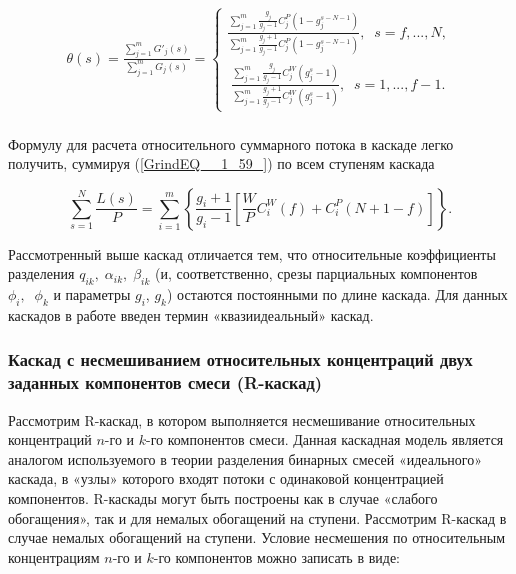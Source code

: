 \begin{equation} \label{GrindEQ__1_61_} 
\begin{array}{l} {\theta (s)=\frac{\sum _{j=1}^{m}G'_{j} (s) }{\sum _{j=1}^{m}G_{j} (s) } =\left\{\begin{array}{l} {\frac{\sum _{j=1}^{m}\frac{g_{j} }{g_{j} -1} C_{j}^{P} \left(1-g_{j}^{s-N-1} \right) }{\sum _{j=1}^{m}\frac{g_{j} +1}{g_{j} -1}  C_{j}^{P} \left(1-g_{j}^{s-N-1} \right)} ,\; \; s=f,...,N,} \\ {\; \frac{\sum _{j=1}^{m}\frac{g_{j} }{g_{j} -1} C_{j}^{W} \left(g_{j}^{s} -1\right) }{\sum _{j=1}^{m}\frac{g_{j} +1}{g_{j} -1}  C_{j}^{W} \left(g_{j}^{s} -1\right)} ,\; \; s=1,...,f-1.} \end{array}\right. } \\ {\; } \end{array} 
\end{equation}

Формулу для расчета относительного суммарного потока в каскаде легко получить, суммируя (\ref{GrindEQ__1_59_}) по всем ступеням каскада

\begin{equation} \label{GrindEQ__1_62_} 
  \sum _{s=1}^{N}\frac{L(s)}{P} =\sum _{i=1}^{m}\left\{\frac{g_{i} +1}{g_{i} -1} \left[\frac{W}{P} C_{i}^{W} (f)+C_{i}^{P} \left(N+1-f\right)\right]\right\}  .   
\end{equation} 
  

Рассмотренный выше каскад отличается тем, что относительные коэффициенты разделения $q_{ik} ,\; \alpha _{ik} ,\; \beta _{ik} $ (и, соответственно, срезы парциальных компонентов $\phi _{i} ,\; \; \phi _{k} $ и параметры $g_{i} $, $g_{k} $) остаются постоянными по длине каскада. Для данных каскадов в работе \cite{sazykinKvaziidealnyeKaskadyDlya2000} введен термин «квазиидеальный» каскад.

\subsubsection{Каскад с несмешиванием относительных концентраций двух заданных компонентов смеси (R-каскад)}

Рассмотрим R-каскад, в котором выполняется несмешивание относительных концентраций $n$-го и $k$-го компонентов смеси. Данная каскадная модель является аналогом используемого в теории разделения бинарных смесей «идеального» каскада, в «узлы» которого входят потоки с одинаковой концентрацией компонентов. R-каскады могут быть построены как в случае «слабого обогащения», так и для немалых обогащений на ступени. Рассмотрим R-каскад в случае немалых обогащений на ступени. Условие несмешения по относительным концентрациям $n$-го и $k$-го компонентов можно записать в виде:

